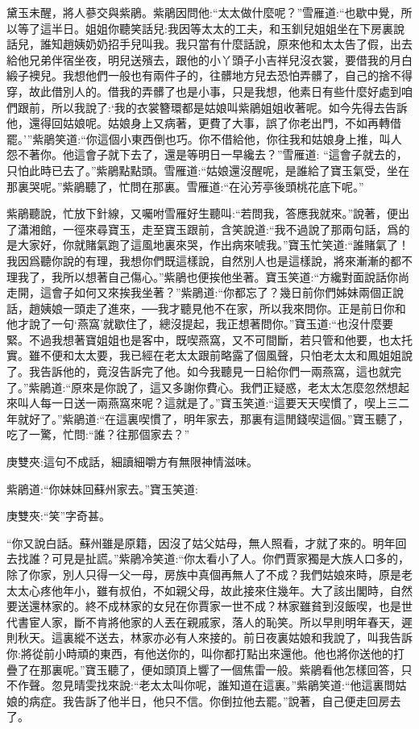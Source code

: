 \begin{parag}
    黛玉未醒，將人蔘交與紫鵑。紫鵑因問他:“太太做什麼呢？”雪雁道:“也歇中覺，所以等了這半日。姐姐你聽笑話兒:我因等太太的工夫，和玉釧兒姐姐坐在下房裏說話兒，誰知趙姨奶奶招手兒叫我。我只當有什麼話說，原來他和太太告了假，出去給他兄弟伴宿坐夜，明兒送殯去，跟他的小丫頭子小吉祥兒沒衣裳，要借我的月白緞子襖兒。我想他們一般也有兩件子的，往髒地方兒去恐怕弄髒了，自己的捨不得穿，故此借別人的。借我的弄髒了也是小事，只是我想，他素日有些什麼好處到咱們跟前，所以我說了:‘我的衣裳簪環都是姑娘叫紫鵑姐姐收著呢。如今先得去告訴他，還得回姑娘呢。姑娘身上又病著，更費了大事，誤了你老出門，不如再轉借罷。’”紫鵑笑道:“你這個小東西倒也巧。你不借給他，你往我和姑娘身上推，叫人怨不著你。他這會子就下去了，還是等明日一早纔去？”雪雁道: “這會子就去的，只怕此時已去了。”紫鵑點點頭。雪雁道:“姑娘還沒醒呢，是誰給了寶玉氣受，坐在那裏哭呢。”紫鵑聽了，忙問在那裏。雪雁道:“在沁芳亭後頭桃花底下呢。”
\end{parag}


\begin{parag}
    紫鵑聽說，忙放下針線，又囑咐雪雁好生聽叫:“若問我，答應我就來。”說著，便出了瀟湘館，一徑來尋寶玉，走至寶玉跟前，含笑說道:“我不過說了那兩句話，爲的是大家好，你就賭氣跑了這風地裏來哭，作出病來唬我。”寶玉忙笑道:“誰賭氣了！我因爲聽你說的有理，我想你們既這樣說，自然別人也是這樣說，將來漸漸的都不理我了，我所以想著自己傷心。”紫鵑也便挨他坐著。寶玉笑道:“方纔對面說話你尚走開，這會子如何又來挨我坐著？”紫鵑道:“你都忘了？幾日前你們姊妹兩個正說話，趙姨娘一頭走了進來，──我才聽見他不在家，所以我來問你。正是前日你和他才說了一句‘燕窩’就歇住了，總沒提起，我正想著問你。”寶玉道:“也沒什麼要緊。不過我想著寶姐姐也是客中，既喫燕窩，又不可間斷，若只管和他要，也太托實。雖不便和太太要，我已經在老太太跟前略露了個風聲，只怕老太太和鳳姐姐說了。我告訴他的，竟沒告訴完了他。如今我聽見一日給你們一兩燕窩，這也就完了。”紫鵑道:“原來是你說了，這又多謝你費心。我們正疑惑，老太太怎麼忽然想起來叫人每一日送一兩燕窩來呢？這就是了。”寶玉笑道:“這要天天喫慣了，喫上三二年就好了。”紫鵑道:“在這裏喫慣了，明年家去，那裏有這閒錢喫這個。”寶玉聽了，吃了一驚，忙問:“誰？往那個家去？”\begin{note}庚雙夾:這句不成話，細讀細嚼方有無限神情滋味。\end{note}紫鵑道:“你妹妹回蘇州家去。”寶玉笑道:\begin{note}庚雙夾:“笑”字奇甚。\end{note}“你又說白話。蘇州雖是原籍，因沒了姑父姑母，無人照看，才就了來的。明年回去找誰？可見是扯謊。”紫鵑冷笑道:“你太看小了人。你們賈家獨是大族人口多的，除了你家，別人只得一父一母，房族中真個再無人了不成？我們姑娘來時，原是老太太心疼他年小，雖有叔伯，不如親父母，故此接來住幾年。大了該出閣時，自然要送還林家的。終不成林家的女兒在你賈家一世不成？林家雖貧到沒飯喫，也是世代書宦人家，斷不肯將他家的人丟在親戚家，落人的恥笑。所以早則明年春天，遲則秋天。這裏縱不送去，林家亦必有人來接的。前日夜裏姑娘和我說了，叫我告訴你:將從前小時頑的東西，有他送你的，叫你都打點出來還他。他也將你送他的打疊了在那裏呢。”寶玉聽了，便如頭頂上響了一個焦雷一般。紫鵑看他怎樣回答，只不作聲。忽見晴雯找來說:“老太太叫你呢，誰知道在這裏。”紫鵑笑道:“他這裏問姑娘的病症。我告訴了他半日，他只不信。你倒拉他去罷。”說著，自己便走回房去了。
\end{parag}


